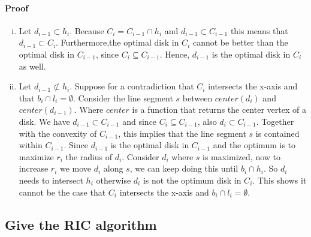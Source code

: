 \documentclass{article}
\begin{document}
\paragraph{Proof}
\begin{enumerate}[(i)]
	\item Let $d_{i-1} \subset h_i$. Because $C_i = C_{i-1}\cap h_i$ and
		$d_{i-1} \subset C_{i-1}$ this means that $d_{i-1} \subset C_i$.
		Furthermore,the optimal disk in $C_i$
		cannot be better than the optimal disk in $C_{i-1}$, since
		$C_i \subseteq C_{i-1}$. Hence, $d_{i-1}$ is the optimal disk
		in $C_i$ as well.
	\item Let $d_{i-1} \not\subset h_{i}$. Suppose for a contradiction that
		$C_i$ intersects the x-axis and that $b_i \cap l_i = \emptyset$.
		Consider the line segment $s$ between $center(d_i)$ and 
		$center(d_{i-1})$.
		Where $center$ is a function that returns the center vertex of a disk.
		We have $d_{i-1} \subset C_{i-1}$ and
		since $C_i \subseteq C_{i-1}$, also $d_i \subset C_{i-1}$.
		Together with the convexity of $C_{i-1}$, this implies that
		the line segment $s$ is contained within $C_{i-1}$.
		Since $d_{i-1}$ is the optimal disk in $C_{i-1}$ and the optimum is to
		maximize $r_i$ the radius of $d_i$. Consider $d_i$
		where $s$ is maximized, now to increase $r_i$ we move $d_i$ along $s$,
		we can keep doing this until $b_i \cap h_i$.
		So $d_i$ needs to intersect $h_i$ otherwise $d_i$ is not the optimum
		disk in $C_i$. This shows it cannot be the case that $C_i$ intersects
		the x-axis and $b_i\cap l_i = \emptyset$.

\end{enumerate}
\subsection{Give the RIC algorithm}
\end{document}
